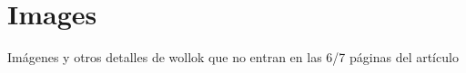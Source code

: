 \documentclass[preprint,10pt]{sigplanconf}
\begin{document}
% 
% 

% 

{
\small


}

\newpage
\appendix
\section{Images}
Imágenes y otros detalles de wollok que no entran en las 6/7 páginas del artículo
\end{document}
